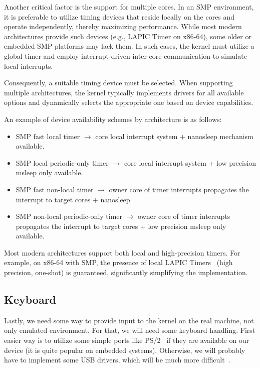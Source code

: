 \documentclass[a4paper,10pt,twoside]{report}
\theoremstyle{definition}
\begin{document}
Another critical factor is the support for multiple cores. In an SMP environment, it is preferable to utilize timing devices that reside locally on the cores and operate independently, thereby maximizing performance. While most modern architectures provide such devices (e.g., LAPIC Timer on x86-64), some older or embedded SMP platforms may lack them. In such cases, the kernel must utilize a global timer and employ interrupt-driven inter-core communication to simulate local interrupts.

Consequently, a suitable timing device must be selected. When supporting multiple architectures, the kernel typically implements drivers for all available options and dynamically selects the appropriate one based on device capabilities.

An example of device availability schemes by architecture is as follows:
\begin{itemize}
\item SMP fast local timer $\rightarrow$ core local interrupt system + nanosleep mechanism available.
\item SMP local periodic-only timer $\rightarrow$ core local interrupt system + low precision msleep only available.
\item SMP fast non-local timer $\rightarrow$ owner core of timer interrupts propagates the interrupt to target cores + nanosleep.
\item SMP non-local periodic-only timer $\rightarrow$ owner core of timer interrupts propagates the interrupt to target cores + low precision msleep only available.
\end{itemize}

Most modern architectures support both local and high-precision timers. For example, on x86-64 with SMP, the presence of local LAPIC Timers~\cite{IntelManual-APIC} (high precision, one-shot) is guaranteed, significantly simplifying the implementation.

\subsection{Keyboard}

Lastly, we need some way to provide input to the kernel on the real machine, not only emulated environment. For that, we will need some keyboard handling. First easier way is to utilize some simple ports like PS/2~\cite{osdev-ps21, osdev-ps22} if they are available on our device (it is quite popular on embedded systems). Otherwise, we will probably have to implement some USB drivers, which will be much more difficult~\cite{usb20-spec, osdev-usb}.
\end{document}
